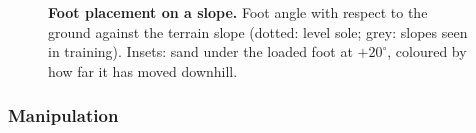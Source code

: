 
\begin{figure}[t]
    \centering
    \caption{
        \textbf{Foot placement on a slope.}
        Foot angle with respect to the ground against the terrain slope (dotted: level sole; grey: slopes seen in training).
        Insets: sand under the loaded foot at $+20^\circ$, coloured by how far it has moved downhill.
    }
    \label{fig:t3_sole}
    \vspace{-3mm}
\end{figure}

\subsubsection{Manipulation}


